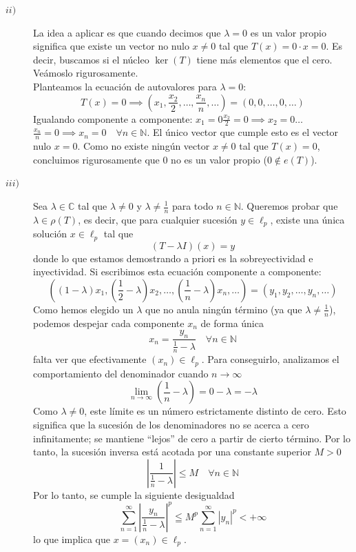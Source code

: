 \begin{ejercicio}
\begin{description}
        \item[$ii)$] La idea a aplicar es que cuando decimos que $\lambda = 0$ es un valor propio significa que existe un vector no nulo $x \neq 0$ tal que $T(x) = 0 \cdot x = 0$. Es decir, buscamos si el núcleo $\ker(T)$ tiene más elementos que el cero. Veámoslo rigurosamente. \\
        \noindent
        Planteamos la ecuación de autovalores para $\lambda = 0$:$$T(x) = 0 \implies \left( x_1, \frac{x_2}{2}, \dots, \frac{x_n}{n}, \dots \right) = (0, 0, \dots, 0, \dots)$$
        Igualando componente a componente:  $x_1 = 0$$\frac{x_2}{2} = 0 \implies x_2 = 0$$\dots$$\frac{x_n}{n} = 0 \implies x_n = 0 \quad \forall n \in \mathbb{N}$. El único vector que cumple esto es el vector nulo $x = 0$. Como no existe ningún vector $x \neq 0$ tal que $T(x) = 0$, concluimos rigurosamente que $0$ no es un valor propio ($0 \notin e(T)$). 
        \item[$iii)$] Sea $\lambda \in \mathbb{C}$ tal que $\lambda \neq 0$ y $\lambda \neq \frac{1}{n}$ para todo $n \in \mathbb{N}$. Queremos probar que $\lambda \in \rho(T)$, es decir, que para cualquier sucesión $y \in \ell_p$, existe una única solución $x \in \ell_p$ tal que
        $$(T - \lambda I)(x) = y$$
        donde lo que estamos demostrando a priori es la sobreyectividad e inyectividad. Si escribimos esta ecuación componente a componente:
        \begin{equation*}
            \left( \left(1 - \lambda\right)x_1, \left(\frac{1}{2} - \lambda\right)x_2, \dots, \left(\frac{1}{n} - \lambda\right)x_n, \dots \right) = (y_1, y_2, \dots, y_n, \dots)
        \end{equation*}
        Como hemos elegido un $\lambda$ que no anula ningún término (ya que $\lambda \neq \frac{1}{n}$), podemos despejar cada componente $x_n$ de forma única
        $$x_n = \frac{y_n}{\frac{1}{n} - \lambda} \quad \forall n \in \mathbb{N}$$
        falta ver que efectivamente $(x_n)\in \ell_p$. Para conseguirlo, analizamos el comportamiento del denominador cuando $n \to \infty$
        $$\lim_{n \to \infty} \left( \frac{1}{n} - \lambda \right) = 0 - \lambda = -\lambda$$Como $\lambda \neq 0$, este límite es un número estrictamente distinto de cero. Esto significa que la sucesión de los denominadores no se acerca a cero infinitamente; se mantiene ``lejos'' de cero a partir de cierto término. Por lo tanto, la sucesión inversa está acotada por una constante superior $M > 0$
        $$\left| \frac{1}{\frac{1}{n} - \lambda} \right| \leq M \quad \forall n \in \mathbb{N}$$
        Por lo tanto, se cumple la siguiente desigualdad
        $$\sum_{n=1}^{\infty} \left| \frac{y_n}{\frac{1}{n} - \lambda} \right|^p \leqq M^p \sum_{n=1}^{\infty} |y_n|^p < +\infty$$
        lo que implica que $x = (x_n) \in \ell_p$. 
    \end{description}
\end{ejercicio}

